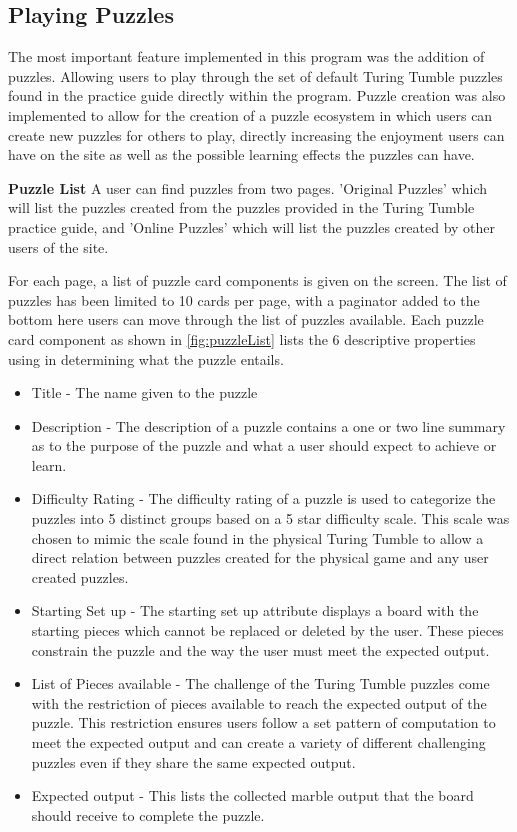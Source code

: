 \documentclass{l4proj}
\begin{document}
\subsection{Playing Puzzles}
The most important feature implemented in this program was the addition of puzzles. Allowing users to play through the set of default Turing Tumble puzzles found in the practice guide directly within the program. Puzzle creation was also implemented to allow for the creation of a puzzle ecosystem in which users can create new puzzles for others to play, directly increasing the enjoyment users can have on the site as well as the possible learning effects the puzzles can have.

\textbf{Puzzle List}
A user can find puzzles from two pages. 'Original Puzzles' which will list the puzzles created from the puzzles provided in the Turing Tumble practice guide, and 'Online Puzzles' which will list the puzzles created by other users of the site.

For each page, a list of puzzle card components is given on the screen. The list of puzzles has been limited to 10 cards per page, with a paginator added to the bottom  here users can move through the list of puzzles available. Each puzzle card component as shown in \ref{fig:puzzleList} lists the 6 descriptive properties using in determining what the puzzle entails. 
\begin{itemize}
    \item Title - The name given to the puzzle
    \item Description - The description of a puzzle contains a one or two line summary as to the purpose of the puzzle and what a user should expect to achieve or learn.
    \item Difficulty Rating - The difficulty rating of a puzzle is used to categorize the puzzles into 5 distinct groups based on a 5 star difficulty scale. This scale was chosen to mimic the scale found in the physical Turing Tumble to allow a direct relation between puzzles created for the physical game and any user created puzzles.
    \item Starting Set up - The starting set up attribute displays a board with the starting pieces which cannot be replaced or deleted by the user. These pieces constrain the puzzle and the way the user must meet the expected output.
    \item List of Pieces available - The challenge of the Turing Tumble puzzles come with the restriction of pieces available to reach the expected output of the puzzle. This restriction ensures users follow a set pattern of computation to meet the expected output and can create a variety of different challenging puzzles even if they share the same expected output.
    \item Expected output - This lists the collected marble output that the board should receive to complete the puzzle.
\end{itemize}
\end{document}
